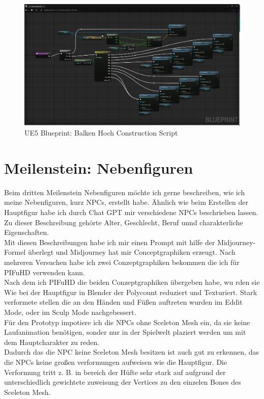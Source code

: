\\
\begin{figure}[h]
	\includegraphics[width=14cm]{BilderFuerBA/Screenshot/UE5/balkenHochBP.png}
	\caption{UE5 Blueprint: Balken Hoch Construction Script}
	\label{UE5balkenHochBP}
\end{figure}

\section {Meilenstein: Nebenfiguren}
Beim dritten Meilenstein Nebenfiguren möchte ich gerne beschreiben, wie ich meine Nebenfiguren, kurz NPCs, erstellt habe. Ähnlich wie beim Erstellen der Hauptfigur habe ich durch Chat GPT mir verschiedene NPCs beschrieben lassen. Zu dieser Beschreibung gehörte Alter, Geschlecht, Beruf unnd charakterliche Eigenschaften.
\\
Mit diesen Beschreibungen habe ich mir einen Prompt mit hilfe der Midjourney-Formel überlegt und Midjourney hat mir Conceptgraphiken erzeugt. Nach mehreren Versuchen habe ich zwei Conzeptgraphiken bekommen die ich für PIFuHD verwenden kann.
\\
Nach dem ich PIFuHD die beiden Conzeptgraphiken übergeben habe, wu rden sie Wie bei der Hauptfigur in Blender der Polycount reduziert und Texturiert.  Stark verformete stellen die an den Händen und Füßen auftreten wurden im Eddit Mode, oder im Sculp Mode nachgebessert.
\\
Für den Prototyp impotiere ich die NPCs ohne Sceleton Mesh ein, da sie keine Laufanimation benötigen, sonder nur in der Spielwelt plaziert werden um mit dem Hauptcharakter zu reden.
\\
Dadurch das die NPC keine Sceleton Mesh besitzen ist auch gut zu erkennen, das die NPCs keine großen verformungen aufweisen wie die Hauptfigur. Die Verformung tritt z. B. in bereich der Hüfte sehr stark auf aufgrund der unterschiedlich gewichtete zuweisung der Vertices zu den einzelen Bones des Sceleton Mesh.



